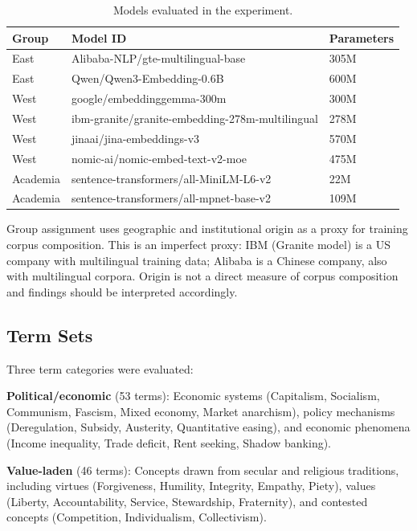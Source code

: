 \documentclass[11pt, letterpaper]{article}
\begin{document}
\begin{table}[H]
  \centering
  \begin{tabular}{lll}
    \toprule
    Group & Model ID & Parameters \\
    \midrule
    East & Alibaba-NLP/gte-multilingual-base & 305M \\
    East & Qwen/Qwen3-Embedding-0.6B & 600M \\
    West & google/embeddinggemma-300m & 300M \\
    West & ibm-granite/granite-embedding-278m-multilingual & 278M \\
    West & jinaai/jina-embeddings-v3 & 570M \\
    West & nomic-ai/nomic-embed-text-v2-moe & 475M \\
    Academia & sentence-transformers/all-MiniLM-L6-v2 & 22M \\
    Academia & sentence-transformers/all-mpnet-base-v2 & 109M \\
    \bottomrule
  \end{tabular}
  \caption{Models evaluated in the experiment.}
  \label{tab:models}
\end{table}

Group assignment uses geographic and institutional origin as a proxy for training corpus composition. This is an imperfect proxy: IBM (Granite model) is a US company with multilingual training data; Alibaba is a Chinese company, also with multilingual corpora. Origin is not a direct measure of corpus composition and findings should be interpreted accordingly.

\subsection{Term Sets}

Three term categories were evaluated:

\textbf{Political/economic} (53 terms): Economic systems (Capitalism, Socialism, Communism, Fascism, Mixed economy, Market anarchism), policy mechanisms (Deregulation, Subsidy, Austerity, Quantitative easing), and economic phenomena (Income inequality, Trade deficit, Rent seeking, Shadow banking).

\textbf{Value-laden} (46 terms): Concepts drawn from secular and religious traditions, including virtues (Forgiveness, Humility, Integrity, Empathy, Piety), values (Liberty, Accountability, Service, Stewardship, Fraternity), and contested concepts (Competition, Individualism, Collectivism).
\end{document}
